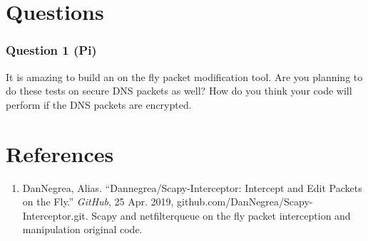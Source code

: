 \section{Questions}
\subsubsection{Question 1 (Pi)}
It is amazing to build an on the fly packet modification tool. Are you planning to do these tests on secure DNS packets as well? How do you think your code will perform if the DNS packets are encrypted.

\section{References}
\begin{enumerate}
    \item[] DanNegrea, Alias. “Dannegrea/Scapy-Interceptor: Intercept and Edit Packets on the Fly.” \textit{GitHub}, 25 Apr. 2019, github.com/DanNegrea/Scapy-Interceptor.git. Scapy and netfilterqueue on the fly packet interception and manipulation original code.
\end{enumerate}
